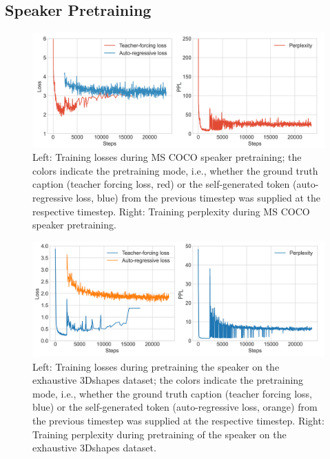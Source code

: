 \subsection{Speaker Pretraining}
\label{speaker_pretraining}
\begin{figure}[h]
	\centering
	\includegraphics[width=\linewidth]{images/coco_pretraining_losses_ppls.png}
	\caption{Left: Training losses during MS COCO speaker pretraining; the colors indicate the pretraining mode, i.e., whether the ground truth caption (teacher forcing loss, red) or the self-generated token (auto-regressive loss, blue) from the previous timestep was supplied at the respective timestep. Right: Training perplexity during MS COCO speaker pretraining.}
	\label{fig:coco_pretraining}
\end{figure}  

\begin{figure}[h]
	\centering
	\includegraphics[width=\linewidth]{images/3dshapes_pretraining_losses_ppls.png}
	\caption{Left: Training losses during pretraining the speaker on the exhaustive 3Dshapes dataset; the colors indicate the pretraining mode, i.e., whether the ground truth caption (teacher forcing loss, blue) or the self-generated token (auto-regressive loss, orange) from the previous timestep was supplied at the respective timestep. Right: Training perplexity during pretraining of the speaker on the exhaustive 3Dshapes dataset.}
	\label{fig:3dshapes_pretraining}
\end{figure}  

